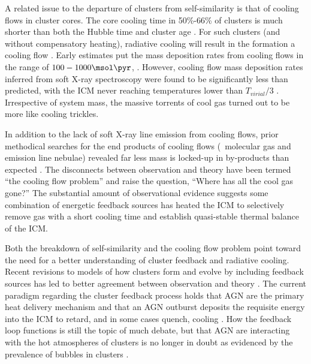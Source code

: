 A related issue to the departure of clusters from self-similarity is
that of cooling flows in cluster cores. The core cooling time in
50\%-66\% of clusters is much shorter than both the Hubble time and
cluster age \citep{1984ApJ...285....1S, 1992MNRAS.258..177E, white97,
1998MNRAS.298..416P, 2005MNRAS.359.1481B}. For such clusters (and
without compensatory heating), radiative cooling will result in the
formation a cooling flow \citep[see][for a
review]{fabiancfreview}. Early estimates put the mass deposition rates
from cooling flows in the range of $100-1000 \msol \pyr$,
\citep[\eg][]{1984ApJ...276...38J}. However, cooling flow mass
deposition rates inferred from soft X-ray spectroscopy were found to
be significantly less than predicted, with the ICM never reaching
temperatures lower than $T_{virial}/3$ \citep{tamura01, peterson01,
peterson03, 2004A&A...413..415K}. Irrespective of system mass, the
massive torrents of cool gas turned out to be more like cooling
trickles.

In addition to the lack of soft X-ray line emission from cooling
flows, prior methodical searches for the end products of cooling flows
(\ie\ molecular gas and emission line nebulae) revealed far less mass
is locked-up in by-products than expected \citep{heckman89,
mcnamara90, odea94, voit95}. The disconnects between observation and
theory have been termed ``the cooling flow problem'' and raise the
question, ``Where has all the cool gas gone?'' The substantial amount
of observational evidence suggests some combination of energetic
feedback sources has heated the ICM to selectively remove gas with a
short cooling time and establish quasi-stable thermal balance of the
ICM.

Both the breakdown of self-similarity and the cooling flow problem
point toward the need for a better understanding of cluster feedback
and radiative cooling. Recent revisions to models of how clusters form
and evolve by including feedback sources has led to better agreement
between observation and theory \citep{bower06, croton06, saro06}. The
current paradigm regarding the cluster feedback process holds that AGN
are the primary heat delivery mechanism and that an AGN outburst
deposits the requisite energy into the ICM to retard, and in some
cases quench, cooling \citep[see][for a review]{mcnamrev}. How the
feedback loop functions is still the topic of much debate, but that
AGN are interacting with the hot atmospheres of clusters is no longer
in doubt as evidenced by the prevalence of bubbles in clusters
\citep{birzan04}.


